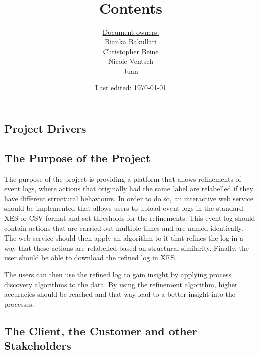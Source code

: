 \documentclass[notitlepage]{article}
\title{%
	\documentName\text{ } \\
  \large \projectName\text{ } \\
  }
\author{
	\large \underline{Document owners:}\\ 
	Bianka Bakullari\\
	\texttt{}
	Christopher Beine\\
	\texttt{}
	Nicole Ventsch\\
	\texttt{}
	Juan\\
	\texttt{}
}
\date{\small{Last edited: \today}}
\begin{document}
\begin{titlepage}
\clearpage\maketitle			%
\thispagestyle{fancy}


\end{titlepage}

\title{ \large \textbf{ Contents}}
\tableofcontents

\newpage

\rfoot{\thepage}				%


\begin{flushleft}				%

\section{Project Drivers}

\subsection{The Purpose of the Project}

The purpose of the project is providing a platform that allows refinements of event logs, where actions that originally had the same label are relabelled if they have different structural behaviours. In order to do so, an interactive web service should be implemented that allows users to upload event logs in the standard XES or CSV format and set thresholds for the refinements. This event log should contain actions that are carried out multiple times and are named identically. The web service should then apply an algorithm to it that refines the log in a way that these actions are relabelled based on structural similarity. Finally, the user should be able to download the refined log in XES.

The users can then use the refined log to gain insight by applying process discovery algorithms to the data. By using the refinement algorithm, higher accuracies should be reached and that way lead to a better insight into the processes.

\subsection{The Client, the Customer and other Stakeholders}


\end{flushleft}
\end{document}
